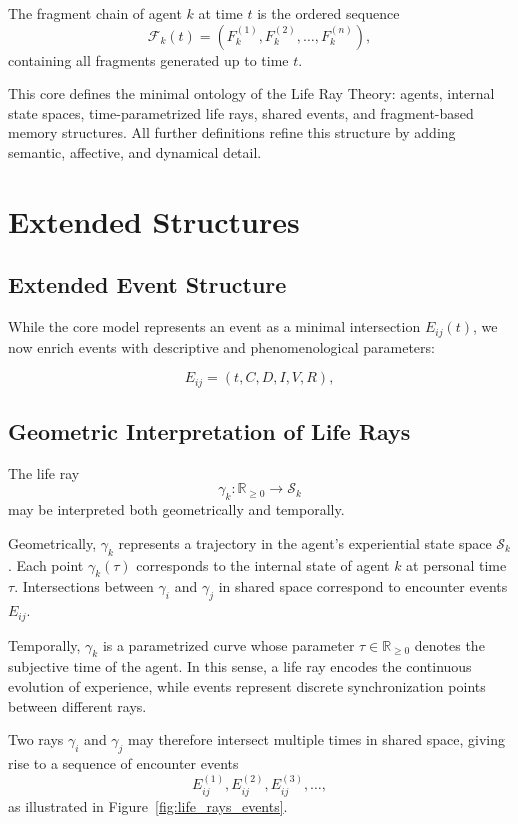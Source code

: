 \documentclass[12pt,a4paper]{article}
\begin{document}
The fragment chain of agent $k$ at time $t$ is the ordered sequence
\[
\mathcal{F}_k(t) = (F_k^{(1)}, F_k^{(2)}, \dots, F_k^{(n)}),
\]
containing all fragments generated up to time $t$.

This core defines the minimal ontology of the Life Ray Theory: agents, internal state spaces,
time-parametrized life rays, shared events, and fragment-based memory structures.
All further definitions refine this structure by adding semantic, affective, and dynamical detail.


\section{Extended Structures}

\subsection{Extended Event Structure}

While the core model represents an event as a minimal intersection $E_{ij}(t)$,
we now enrich events with descriptive and phenomenological parameters:

\[
E_{ij} = (t, C, D, I, V, R),
\]

\subsection{Geometric Interpretation of Life Rays}

The life ray 
\[
\gamma_k : \mathbb{R}_{\ge 0} \to \mathcal{S}_k
\]
may be interpreted both geometrically and temporally.

Geometrically, $\gamma_k$ represents a trajectory in the agent’s experiential state space
$\mathcal{S}_k$. Each point $\gamma_k(\tau)$ corresponds to the internal state of agent $k$
at personal time $\tau$. Intersections between $\gamma_i$ and $\gamma_j$ in shared space
correspond to encounter events $E_{ij}$.

Temporally, $\gamma_k$ is a parametrized curve whose parameter $\tau \in \mathbb{R}_{\ge 0}$
denotes the subjective time of the agent. In this sense, a life ray encodes the continuous
evolution of experience, while events represent discrete synchronization points between
different rays.

Two rays $\gamma_i$ and $\gamma_j$ may therefore intersect multiple times in shared space,
giving rise to a sequence of encounter events
\[
E_{ij}^{(1)}, E_{ij}^{(2)}, E_{ij}^{(3)}, \dots,
\]
as illustrated in Figure~\ref{fig:life_rays_events}.
\end{document}
